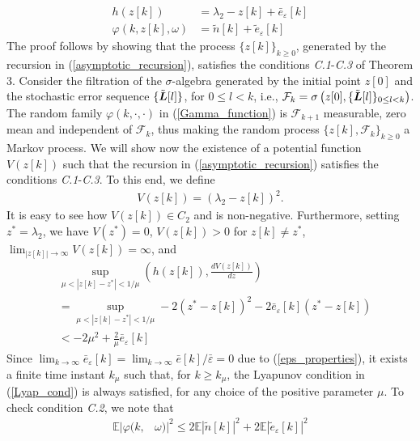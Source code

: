 \documentclass[10pt,twocolumn]{IEEEtran}
\def\bL{\mbox{\boldmath $L$}}
\begin{document}
\begin{align}
       h(z[k])&=\lambda_{2}-z[k]+\bar{e}_{\varepsilon}[k] \\
       \varphi(k,z[k],\omega)&=\tilde{n}[k]+\tilde{e}_{\varepsilon}[k] \label{Gamma_function}
\end{align}
The proof follows by showing that the process $\{z[k]\}_{k\geq0}$, generated by the recursion in (\ref{asymptotic_recursion}), satisfies the  conditions \textit{C.1}-\textit{C.3} of Theorem 3. Consider the filtration of the $\sigma$-algebra generated by the initial point $z[0]$ and the stochastic error sequence $\{\tilde{\bL}[l]\}$, for $0\leq l<k$, i.e.,
$\mathcal{F}_k=\sigma\left(z[0],\{\tilde{\bL}[l]\}_{0\leq l<k}\right)$.
The random family ${\varphi}(k,\cdot,\cdot)$ in (\ref{Gamma_function}) is $\mathcal{F}_{k+1}$ measurable, zero mean and independent of $\mathcal{F}_k$, thus making the random process $\{z[k],\mathcal{F}_k\}_{k\geq0}$ a Markov process. We will show now the existence of a potential function $V(z[k])$ such that the recursion in (\ref{asymptotic_recursion}) satisfies the conditions \textit{C.1}-\textit{C.3}. To this end, we define
\begin{eqnarray}\label{Potential_V}
V(z[k])=\left(\lambda_{2}-z[k]\right)^2.
\end{eqnarray}
It is easy to see how $V(z[k])\in C_2$ and is non-negative. Furthermore, setting $z^*=\lambda_{2}$, we have $V(z^*)=0$, $V(z[k])>0$ for $z[k]\ne z^*$, $\displaystyle \lim_{|z[k]|\rightarrow \infty}V(z[k])=\infty$, and
\begin{align}
&\sup_{\mu<|z[k]-z^*|<1/\mu}\left(h(z[k]),\frac{dV(z[k])}{dz}\right) \label{Lyap_cond}\\
&=\sup_{\mu<|z[k]-z^*|<1/\mu}-2(z^*-z[k])^2-2\bar{e}_{\varepsilon}[k](z^*-z[k]) \nonumber\\
&<-2\mu^2+\frac{2}{\mu}\bar{e}_{\varepsilon}[k]  \nonumber
\end{align}
Since $\displaystyle \lim_{k\rightarrow\infty}\bar{e}_{\varepsilon}[k]=\lim_{k\rightarrow\infty}\bar{e}[k]/\bar{\varepsilon}=0$ due to (\ref{eps_properties}), it exists a finite time instant $k_\mu$ such that, for $k\geq k_\mu$, the Lyapunov condition in (\ref{Lyap_cond}) is always satisfied, for any choice of the positive parameter $\mu$. To check condition \textit{C.2}, we note that
\begin{align}\label{Gamma}
\mathbb{E}|\varphi(k,&\omega)|^2\leq2\mathbb{E}\left|\tilde{n}[k]\right|^2+2\mathbb{E}\left|\tilde{e}_{\varepsilon}[k]\right|^2
\end{align}
\end{document}
